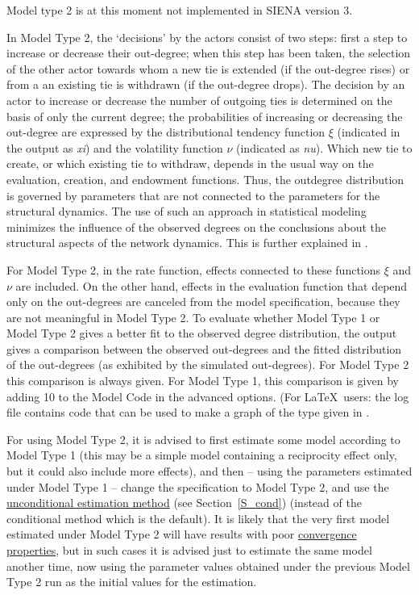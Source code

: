 \documentclass[a4paper,fleqn,11pt]{article}
\newcommand{\+}{\, + \,}
\newcommand{\SI}{{\sf SIENA }}
\begin{document}
Model type 2 is at this moment not implemented in \SI version 3.
\medskip
\fi

\iffalse
In Model Type 2, the `decisions' by the actors
consist of two steps: first a step to increase or decrease their
out-degree; when this step has been taken, the selection of the
other actor towards whom a new tie is extended (if the out-degree
rises) or from a an existing tie is withdrawn (if the out-degree
drops).
The decision by an actor to increase or decrease the number of outgoing ties
is determined on the basis
of only the current degree; the probabilities of increasing or
decreasing the out-degree are expressed by the distributional
tendency function $\xi$ (indicated in the output as \emph{xi}) and
the volatility function $\nu$ (indicated as \emph{nu}). Which new
tie to create, or which existing tie to withdraw, depends in the
usual way on the evaluation, creation, and endowment functions. Thus, the
outdegree distribution is governed by parameters that are not
connected to the parameters for the structural dynamics. The use of
such an approach in statistical modeling minimizes the influence of
the observed degrees on the conclusions about the structural aspects
of the network dynamics. This is further explained in \citet{Snijders03}.

For Model Type 2, in the rate function, effects connected to these
functions $\xi$ and $\nu$ are included. On the other hand, effects
in the evaluation function that depend only on the out-degrees are
canceled from the model specification, because they are not
meaningful in Model Type 2. To evaluate whether Model Type 1 or
Model Type 2 gives a better fit to the observed degree distribution,
the output gives a comparison between the observed out-degrees and
the fitted distribution of the out-degrees (as exhibited by the
simulated out-degrees). For Model Type 2 this comparison is always
given. For Model Type 1, this comparison is given by adding 10 to the
Model Code in the advanced options. (For \LaTeX\ users: the log
file contains code that can be used to make a graph of the type
given in \citet{Snijders03}.

For using Model Type 2, it is advised to first estimate some model
according to Model Type 1 (this may be a simple model containing a
reciprocity effect only, but it could also include more effects),
and then -- using the parameters estimated under Model Type 1 --
change the specification to Model Type 2, and use the
\hyperlink{T_S_cond}{unconditional estimation method}
(see Section~\ref{S_cond}) (instead of the conditional method which is the
default). It is likely that the very first model estimated under
Model Type 2 will have results with poor
\hyperlink{T_convergence}{convergence properties}, but in such
cases it is advised just to estimate the same model another time,
now using the parameter values obtained under the previous Model
Type 2 run as the initial values for the estimation.
\end{document}
